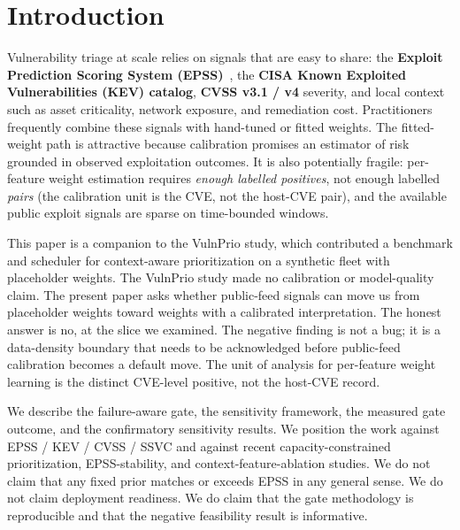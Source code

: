 \section{Introduction}
Vulnerability triage at scale relies on signals that are easy to share: the \textbf{Exploit Prediction Scoring System (EPSS)}~\cite{Jacobs2021EPSS,Jacobs2023EnhancingEPSS}, the \textbf{CISA Known Exploited Vulnerabilities (KEV) catalog}, \textbf{CVSS v3.1 / v4} severity, and local context such as asset criticality, network exposure, and remediation cost. Practitioners frequently combine these signals with hand-tuned or fitted weights. The fitted-weight path is attractive because calibration promises an estimator of risk grounded in observed exploitation outcomes. It is also potentially fragile: per-feature weight estimation requires \emph{enough labelled positives}, not enough labelled \emph{pairs} (the calibration unit is the CVE, not the host-CVE pair), and the available public exploit signals are sparse on time-bounded windows.

This paper is a companion to the VulnPrio study, which contributed a benchmark and scheduler for context-aware prioritization on a synthetic fleet with placeholder weights. The VulnPrio study made no calibration or model-quality claim. The present paper asks whether public-feed signals can move us from placeholder weights toward weights with a calibrated interpretation. The honest answer is no, at the slice we examined. The negative finding is not a bug; it is a data-density boundary that needs to be acknowledged before public-feed calibration becomes a default move. The unit of analysis for per-feature weight learning is the distinct CVE-level positive, not the host-CVE record.

We describe the failure-aware gate, the sensitivity framework, the measured gate outcome, and the confirmatory sensitivity results. We position the work against EPSS / KEV / CVSS / SSVC and against recent capacity-constrained prioritization, EPSS-stability, and context-feature-ablation studies. We do not claim that any fixed prior matches or exceeds EPSS in any general sense. We do not claim deployment readiness. We do claim that the gate methodology is reproducible and that the negative feasibility result is informative.
